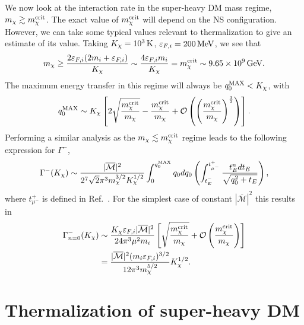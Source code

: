 We now look at the interaction rate in the super-heavy DM mass regime, $m_\chi \gtrsim m_\chi^{\rm crit}$.
The exact value of $m_\chi^{\rm crit}$ will depend on the NS configuration. However, we can take some typical values relevant to thermalization to give an estimate of its value. Taking $K_\chi=10^3{\rm \,K}$, $\varepsilon_{F,i}=200{\rm \,MeV}$, we see that
\begin{equation}
    m_\chi \ge \frac{2\varepsilon_{F,i}(2m_i+\varepsilon_{F,i})}{ K_\chi} \sim \frac{4\varepsilon_{F,i} m_i}{K_\chi} = m_\chi^{\rm crit}\sim 9.65\times10^9{\rm \,GeV}. 
\end{equation}
The maximum energy transfer in this regime will always be $q_0^{\rm MAX}<K_\chi$, with
\begin{equation}
    q_0^{\rm MAX}\sim K_\chi\left[2\sqrt{\frac{m_\chi^{\rm crit}}{m_\chi }} - \frac{m_\chi^{\rm crit}}{m_\chi } +\mathcal{O}\left(\left(\frac{m_\chi^{\rm crit}}{m_\chi}\right)^{\frac{3}{2}}\right)\right].
 \end{equation}
Performing a similar analysis as the $m_\chi \lesssim m_\chi^{\rm crit}$ regime leads to the following expression for $\Gamma^-$,
\begin{equation}
\Gamma^{-}(K_\chi) \sim \frac{|\overline{\mathcal{M}}|^2}{2^7\sqrt{2}\pi^3m_\chi^{3/2}K_\chi^{1/2}}\int_0^{	q_0^{\rm MAX}}q_0 dq_0 \left(\int_{t_{E}^{-}}^{t_{\mu^-}^{+}} \frac{t_E^n dt_E }{\sqrt{q_0^2+t_E}} \right),  
\end{equation} 
where $t_{\mu^-}^+$ is defined in Ref.~\cite{Bell:2020jou_sep_ImprovedTreatmentDark}. 
For the simplest case of constant $|\overline{\mathcal{M}}|^2$ this results in 
\begin{align}
\Gamma^{-}_{n=0}(K_\chi) & \sim  
\frac{K_\chi \varepsilon_{F,i} |\overline{\mathcal{M}}|^2}{24\pi^3\mu^2m_i}\left[\sqrt{\frac{m_\chi^{\rm crit}}{m_\chi}}+\mathcal{O}\left(\frac{m_\chi^{\rm crit}}{m_\chi}\right)\right] \nonumber\\
& = \frac{|\overline{\mathcal{M}}|^2(m_i\varepsilon_{F,i})^{3/2}}{12 \pi^3m_\chi^{5/2}}K_\chi^{1/2}.\label{ch6:eq:intraten0largem}
\end{align}



\section{Thermalization of super-heavy DM}
\label{ch6:sec:thermsuperheavy}



